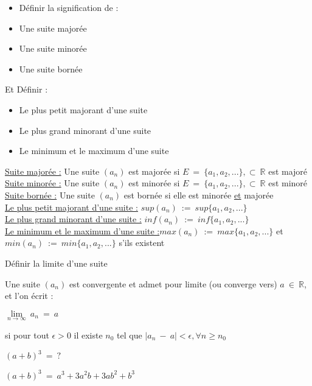 \documentclass[12pt]{article}
\newcommand*{\xfield}[1]{\begin{mdframed}\centering #1\end{mdframed}\bigskip}
\newenvironment{note}{}{}
\begin{document}
\begin{note}
    \xfield{
        \begin{itemize}
        \item Définir la signification de :
        \item Une suite majorée
        \item Une suite minorée
        \item Une suite bornée
        \end{itemize}
        Et Définir :
        \begin{itemize}
        \item Le plus petit majorant d'une suite
        \item Le plus grand minorant d'une suite
        \item Le minimum et le maximum d'une suite
        \end{itemize}
    }
    \xfield{
        \underline{Suite majorée :} Une suite $(a_n)$ est majorée si $E\ =\ \{a_1,a_2,...\}, \subset\ \mathbb{R}$ est majoré\\
        \underline{Suite minorée :} Une suite $(a_n)$ est minorée si $E\ =\ \{a_1,a_2,...\}, \subset\ \mathbb{R}$ est minoré\\
        \underline{Suite bornée :} Une suite $(a_n)$ est bornée si elle est minorée \underline{et} majorée\\
        \underline{Le plus petit majorant d'une suite :} $sup(a_n)\ :=\ sup\{a_1,a_2,...\}$\\
        \underline{Le plus grand minorant d'une suite :} $inf(a_n)\ :=\ inf\{a_1,a_2,...\}$\\
        \underline{Le minimum et le maximum d'une suite :}$max(a_n)\ :=\ max\{a_1,a_2,...\}$ et $min(a_n)\ :=\ min\{a_1,a_2,...\}$ s'ils existent
    }
\end{note}

\begin{note}
    \xfield{Définir la limite d'une suite}
    \xfield{
        Une suite $(a_n)$ est convergente et admet pour limite (ou converge vers) $a\ \in\ \mathbb{R}$, et l'on écrit :\\
        \begin{center}
        $\lim\limits_{n \to \infty}\ a_n\ =\ a$
        \end{center}
        si pour tout $\epsilon >0$ il existe $n_0$ tel que $|a_n\ -\ a| < \epsilon, \forall n \ge n_0$
    }
\end{note}

\begin{note}
    \xfield{$(a+b)^3\ =\ ?$}
    \xfield{$(a+b)^3\ =\ a^3 + 3a^2b+3ab^2+b^3$}
\end{note}
\end{document}
